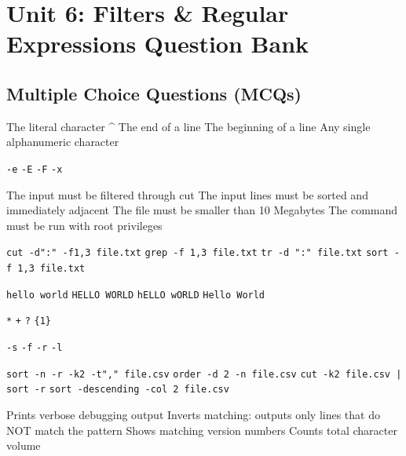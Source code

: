 \chapter{Unit 6: Filters \& Regular Expressions Question Bank}

\section{Multiple Choice Questions (MCQs)}

{The literal character \^{}}
{The end of a line}
{The beginning of a line}
{Any single alphanumeric character}

{\texttt{-e}}
{\texttt{-E}}
{\texttt{-F}}
{\texttt{-x}}

{The input must be filtered through cut}
{The input lines must be sorted and immediately adjacent}
{The file must be smaller than 10 Megabytes}
{The command must be run with root privileges}

{\texttt{cut -d":" -f1,3 file.txt}}
{\texttt{grep -f 1,3 file.txt}}
{\texttt{tr -d ":" file.txt}}
{\texttt{sort -f 1,3 file.txt}}

{\texttt{hello world}}
{\texttt{HELLO WORLD}}
{\texttt{hELLO wORLD}}
{\texttt{Hello World}}

{\texttt{*}}
{\texttt{+}}
{\texttt{?}}
{\texttt{\{1\}}}

{\texttt{-s}}
{\texttt{-f}}
{\texttt{-r}}
{\texttt{-l}}

{\texttt{sort -n -r -k2 -t"," file.csv}}
{\texttt{order -d 2 -n file.csv}}
{\texttt{cut -k2 file.csv | sort -r}}
{\texttt{sort -descending -col 2 file.csv}}

{Prints verbose debugging output}
{Inverts matching: outputs only lines that do NOT match the pattern}
{Shows matching version numbers}
{Counts total character volume}

